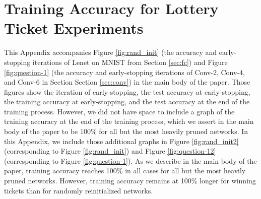 \section{Training Accuracy for Lottery Ticket Experiments}
\label{app:train}

This Appendix accompanies Figure \ref{fig:rand_init} (the accuracy and early-stopping iterations of Lenet on MNIST from Section \ref{sec:fc}) and Figure \ref{fig:question-1} (the accuracy and early-stopping iterations of Conv-2, Conv-4, and Conv-6 in Section Section \ref{sec:conv}) in the main body of the paper.
Those figures show the iteration of early-stopping, the test accuracy at early-stopping, the training accuracy at early-stopping, and the test accuracy at the end
of the training process. However, we did not have space to include a graph of the training accuracy at the end of the training process, which we assert in the main body of the paper to be
100\% for all but the most heavily pruned networks. In this Appendix, we include those additional graphs in Figure \ref{fig:rand_init2} (corresponding to Figure \ref{fig:rand_init}) and Figure \ref{fig:question-12} (corresponding to Figure \ref{fig:question-1}). As we describe in the main body of the paper, training accuracy reaches 100\% in all cases
for all but the most heavily pruned networks. However, training accuracy remains at 100\% longer for winning tickets than for randomly reinitialized networks.

